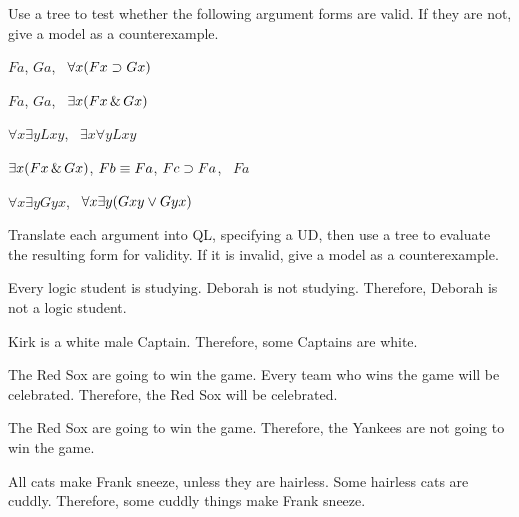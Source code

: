 \solutions
\problempart
\label{pr.QL.trees.validity}
Use a tree to test whether the following argument forms are valid. If they are not, give a model as a counterexample.
\begin{earg}
\item $Fa$, $Ga$, \therefore\ $\forall x (Fx \supset Gx)$
\item $Fa$, $Ga$, \therefore\ $\exists x (Fx \,\&\, Gx)$
\item $\forall x \exists y Lxy$, \therefore\ $\exists x \forall y Lxy$
\item $\exists x (Fx \,\&\, Gx)$, $Fb \equiv Fa$, $Fc \supset Fa$, \therefore\ $Fa$
\item $\forall x \exists y Gyx$, \therefore\ $\forall x \exists y (Gxy \vee Gyx)$
\end{earg}

\problempart
\label{pr.QL.trees.translation.and.validity}
Translate each argument into QL, specifying a UD, then use a tree to evaluate the resulting form for validity. If it is invalid, give a model as a counterexample.
\begin{earg}
\item Every logic student is studying. Deborah is not studying. Therefore, Deborah is not a logic student.
\item Kirk is a white male Captain. Therefore, some Captains are white.
\item The Red Sox are going to win the game. Every team who wins the game will be celebrated. Therefore, the Red Sox will be celebrated.
\item The Red Sox are going to win the game. Therefore, the Yankees are not going to win the game.
\item All cats make Frank sneeze, unless they are hairless. Some hairless cats are cuddly. Therefore, some cuddly things make Frank sneeze.
\end{earg}